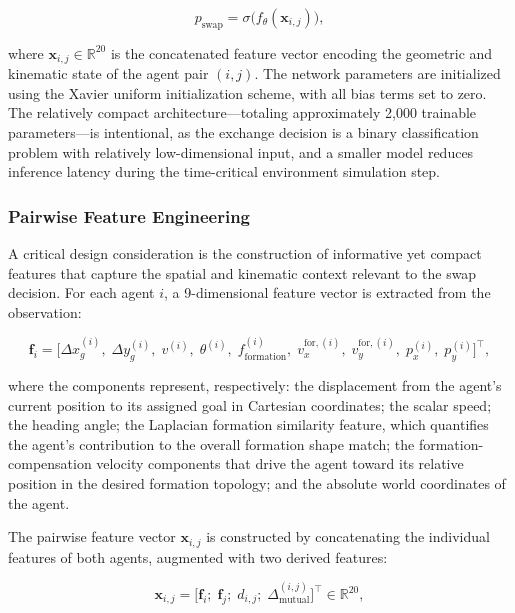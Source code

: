 \begin{equation}
    p_{\text{swap}} = \sigma\bigl(f_{\theta}(\mathbf{x}_{i,j})\bigr),
\end{equation}

where $\mathbf{x}_{i,j} \in \mathbb{R}^{20}$ is the concatenated feature vector encoding the geometric and kinematic state of the agent pair $(i, j)$. The network parameters are initialized using the Xavier uniform initialization scheme, with all bias terms set to zero. The relatively compact architecture---totaling approximately 2,000 trainable parameters---is intentional, as the exchange decision is a binary classification problem with relatively low-dimensional input, and a smaller model reduces inference latency during the time-critical environment simulation step.

\subsubsection{Pairwise Feature Engineering}

A critical design consideration is the construction of informative yet compact features that capture the spatial and kinematic context relevant to the swap decision. For each agent $i$, a 9-dimensional feature vector is extracted from the observation:

\begin{equation}
    \mathbf{f}_i = \bigl[\Delta x_g^{(i)},\; \Delta y_g^{(i)},\; v^{(i)},\; \theta^{(i)},\; f_{\text{formation}}^{(i)},\; v_x^{\text{for},(i)},\; v_y^{\text{for},(i)},\; p_x^{(i)},\; p_y^{(i)}\bigr]^\top,
\end{equation}

where the components represent, respectively: the displacement from the agent's current position to its assigned goal in Cartesian coordinates; the scalar speed; the heading angle; the Laplacian formation similarity feature, which quantifies the agent's contribution to the overall formation shape match; the formation-compensation velocity components that drive the agent toward its relative position in the desired formation topology; and the absolute world coordinates of the agent.

The pairwise feature vector $\mathbf{x}_{i,j}$ is constructed by concatenating the individual features of both agents, augmented with two derived features:

\begin{equation}
    \mathbf{x}_{i,j} = \bigl[\mathbf{f}_i;\; \mathbf{f}_j;\; d_{i,j};\; \Delta_{\text{mutual}}^{(i,j)}\bigr]^\top \in \mathbb{R}^{20},
\end{equation}

